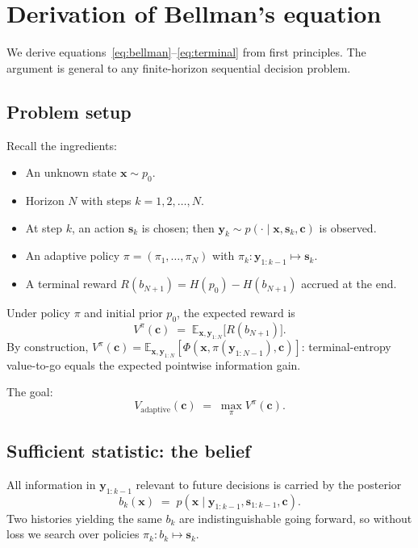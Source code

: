 \documentclass[11pt,a4paper]{article}
\newcommand{\E}{\mathbb{E}}
\begin{document}
\section{Derivation of Bellman's equation}
\label{app:bellman}

We derive equations~\eqref{eq:bellman}--\eqref{eq:terminal} from first principles.  The argument is general to any finite-horizon sequential decision problem.

\subsection{Problem setup}

Recall the ingredients:
\begin{itemize}[nosep]
  \item An unknown state $\bm{x} \sim p_0$.
  \item Horizon $N$ with steps $k = 1, 2, \ldots, N$.
  \item At step $k$, an action $\bm{s}_k$ is chosen; then $\bm{y}_k \sim p(\cdot \mid \bm{x}, \bm{s}_k, \bm{c})$ is observed.
  \item An adaptive policy $\pi = (\pi_1, \ldots, \pi_N)$ with $\pi_k: \bm{y}_{1:k-1} \mapsto \bm{s}_k$.
  \item A terminal reward $R(b_{N+1}) = H(p_0) - H(b_{N+1})$ accrued at the end.
\end{itemize}

Under policy $\pi$ and initial prior $p_0$, the expected reward is
\begin{equation}
  V^{\pi}(\bm{c}) \;=\; \E_{\bm{x}, \bm{y}_{1:N}}\!\bigl[R(b_{N+1})\bigr].
\end{equation}
By construction, $V^{\pi}(\bm{c}) = \E_{\bm{x}, \bm{y}_{1:N}}[\Phi(\bm{x}, \pi(\bm{y}_{1:N-1}), \bm{c})]$: terminal-entropy value-to-go equals the expected pointwise information gain.

The goal:
\begin{equation}
  V_{\mathrm{adaptive}}(\bm{c}) \;=\; \max_\pi V^{\pi}(\bm{c}).
\end{equation}

\subsection{Sufficient statistic: the belief}

All information in $\bm{y}_{1:k-1}$ relevant to future decisions is carried by the posterior
\begin{equation}
  b_k(\bm{x}) \;=\; p(\bm{x} \mid \bm{y}_{1:k-1}, \bm{s}_{1:k-1}, \bm{c}).
\end{equation}
Two histories yielding the same $b_k$ are indistinguishable going forward, so without loss we search over policies $\pi_k: b_k \mapsto \bm{s}_k$.
\end{document}
